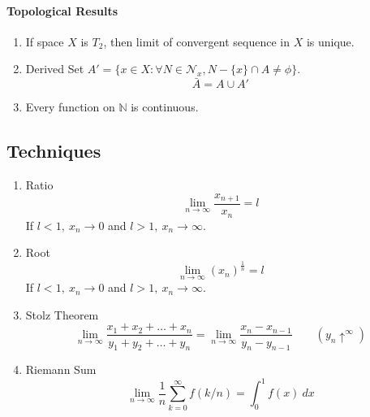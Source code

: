 \paragraph{Topological Results}
\begin{enumerate}
	\item If space $X$ is $T_2$, then limit of convergent sequence in $X$ is unique.
	\item Derived Set $A' = \{ x \in X : \forall N \in \mathcal{N}_x, N-\{x\} \cap A \ne \phi \}$.
		\[ \bar{A} = A \cup A' \]
	\item Every function on $\mathbb{N}$ is continuous.
\end{enumerate}

\subsection{Techniques}
\begin{enumerate}
	\item Ratio
		\[ \lim_{n \to \infty} \frac{x_{n+1}}{x_n} = l \]
		If $l < 1,\ x_n \to 0$ and $l > 1,\ x_n \to \infty$.
	\item Root
		\[ \lim_{n \to \infty} (x_n)^{\frac{1}{n}} = l \]
		If $l < 1,\ x_n \to 0$ and $l > 1,\ x_n \to \infty$.
	\item Stolz Theorem
		\[ \lim_{n \to \infty} \frac{x_1+x_2+\dots+x_n}{y_1+y_2+\dots+y_n} = \lim_{n \to \infty} \frac{x_n-x_{n-1}}{y_n-y_{n-1}} \qquad (y_n \uparrow^\infty) \]
	\item Riemann Sum
		\[ \lim_{n \to \infty} \frac{1}{n} \sum_{k=0}^\infty f(k/n) = \int_0^1 f(x)\ dx \]
\end{enumerate}

